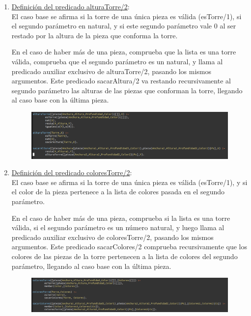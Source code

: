 \documentclass{article}
\begin{document}
\begin{enumerate}
\item  \underline{Definición del predicado alturaTorre/2}:\\

 El caso base se afirma si la torre de una única pieza es válida (esTorre/1), si el segundo parámetro en natural, y si este segundo parámetro vale 0 al ser restado por la altura de la pieza que conforma la torre.

 En el caso de haber más de una pieza, comprueba que la lista es una torre válida, comprueba que el segundo parámetro es un natural, y llama al predicado auxiliar exclusivo de alturaTorre/2, pasando los mismos argumentos. Este predicado sacarAltura/2 va restando recursivamente al segundo parámetro las alturas de las piezas que conforman la torre, llegando al caso base con la última pieza.

\begin{figure}[H]
	\centering
	\includegraphics[width=0.75 \textwidth]{images/alturaTorre.png}
\end{figure}

\newpage

\item  \underline{Definición del predicado coloresTorre/2}:\\

 El caso base se afirma si la torre de una única pieza es válida (esTorre/1), y si el color de la pieza pertenece a la lista de colores pasada en el segundo parámetro.

 En el caso de haber más de una pieza, comprueba si la lista es una torre válida, si el segundo parámetro es un número natural, y luego llama al predicado auxiliar exclusivo de coloresTorre/2, pasando los mismos argumentos. Este predicado sacarColores/2 comprueba recursivamente que los colores de las piezas de la torre pertenecen a la lista de colores del segundo parámetro, llegando al caso base con la última pieza.

\begin{figure}[H]
	\centering
	\includegraphics[width=0.75 \textwidth]{images/coloresTorre.png}
\end{figure}



\end{enumerate}
\end{document}
